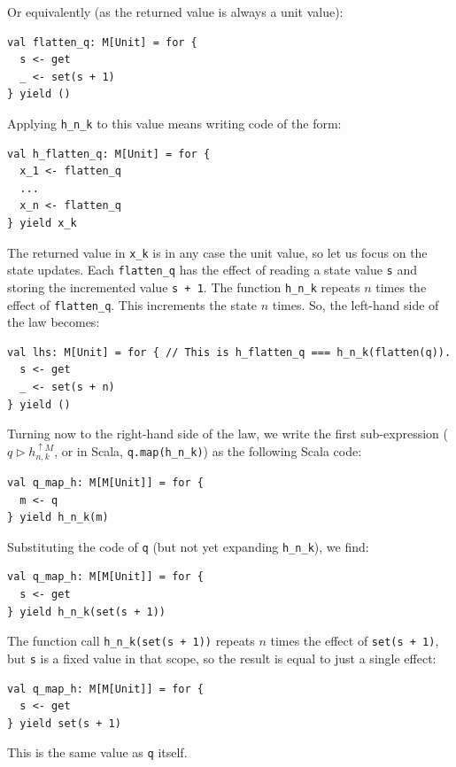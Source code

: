 Or equivalently (as the returned value is always a unit value):
\begin{lstlisting}
val flatten_q: M[Unit] = for {
  s <- get
  _ <- set(s + 1)
} yield ()
\end{lstlisting}
Applying \lstinline!h_n_k! to this value means writing code of the
form:
\begin{lstlisting}
val h_flatten_q: M[Unit] = for {
  x_1 <- flatten_q
  ...
  x_n <- flatten_q
} yield x_k
\end{lstlisting}
The returned value in \lstinline!x_k! is in any case the unit value,
so let us focus on the state updates. Each \lstinline!flatten_q!
has the effect of reading a state value \lstinline!s! and storing
the incremented value \lstinline!s + 1!. The function \lstinline!h_n_k!
repeats $n$ times the effect of \lstinline!flatten_q!. This increments
the state $n$ times. So, the left-hand side of the law becomes:
\begin{lstlisting}
val lhs: M[Unit] = for { // This is h_flatten_q === h_n_k(flatten(q)).
  s <- get
  _ <- set(s + n)
} yield ()
\end{lstlisting}

Turning now to the right-hand side of the law, we write the first
sub-expression ($q\triangleright h_{n,k}^{\uparrow M}$, or in Scala,
\lstinline!q.map(h_n_k)!) as the following Scala code:
\begin{lstlisting}
val q_map_h: M[M[Unit]] = for {
  m <- q
} yield h_n_k(m)
\end{lstlisting}
Substituting the code of \lstinline!q! (but not yet expanding \lstinline!h_n_k!),
we find:
\begin{lstlisting}
val q_map_h: M[M[Unit]] = for {
  s <- get
} yield h_n_k(set(s + 1))
\end{lstlisting}
The function call \lstinline!h_n_k(set(s + 1))! repeats $n$ times
the effect of \lstinline!set(s + 1)!, but \lstinline!s! is a fixed
value in that scope, so the result is equal to just a single effect:
\begin{lstlisting}
val q_map_h: M[M[Unit]] = for {
  s <- get
} yield set(s + 1)
\end{lstlisting}
This is the same value as \lstinline!q! itself.

